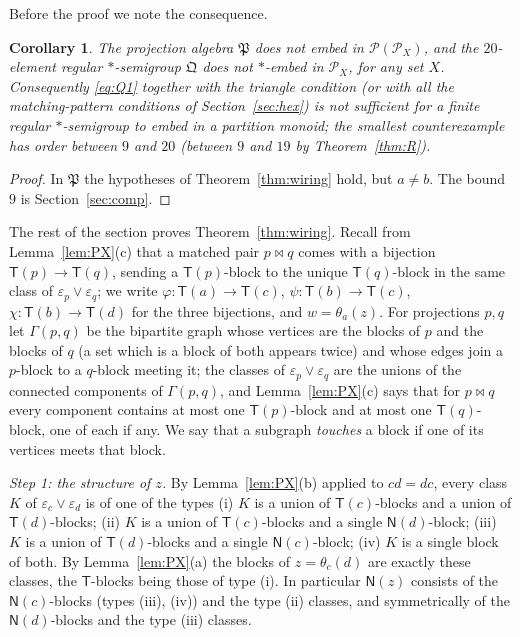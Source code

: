 \documentclass[11pt]{amsart}
\newtheorem{corollary}[theorem]{Corollary}
\theoremstyle{definition}
\renewcommand{\P}{\mathcal{P}}
\newcommand{\T}{\mathsf{T}}
\newcommand{\N}{\mathsf{N}}
\begin{document}
Before the proof we note the consequence.

\begin{corollary}\label{cor:wiring}
The projection algebra $\mathfrak P$ does not embed in $\P(\P_X)$, and the $20$-element regular $*$-semigroup $\mathfrak Q$ does not $*$-embed in $\P_X$, for any set $X$. Consequently \eqref{eq:Q1} together with the triangle condition (or with all the matching-pattern conditions of Section~\ref{sec:hex}) is not sufficient for a finite regular $*$-semigroup to embed in a partition monoid; the smallest counterexample has order between $9$ and $20$ (between $9$ and $19$ by Theorem~\ref{thm:R}).
\end{corollary}
\begin{proof}
In $\mathfrak P$ the hypotheses of Theorem~\ref{thm:wiring} hold, but $a\ne b$. The bound $9$ is Section~\ref{sec:comp}.
\end{proof}

The rest of the section proves Theorem~\ref{thm:wiring}. Recall from Lemma~\ref{lem:PX}(c) that a matched pair $p\bowtie q$ comes with a bijection $\T(p)\to\T(q)$, sending a $\T(p)$-block to the unique $\T(q)$-block in the same class of $\varepsilon_p\vee\varepsilon_q$; we write $\varphi\colon\T(a)\to\T(c)$, $\psi\colon\T(b)\to\T(c)$, $\chi\colon\T(b)\to\T(d)$ for the three bijections, and $w=\theta_a(z)$. For projections $p,q$ let $\Gamma(p,q)$ be the bipartite graph whose vertices are the blocks of $p$ and the blocks of $q$ (a set which is a block of both appears twice) and whose edges join a $p$-block to a $q$-block meeting it; the classes of $\varepsilon_p\vee\varepsilon_q$ are the unions of the connected components of $\Gamma(p,q)$, and Lemma~\ref{lem:PX}(c) says that for $p\bowtie q$ every component contains at most one $\T(p)$-block and at most one $\T(q)$-block, one of each if any. We say that a subgraph \emph{touches} a block if one of its vertices meets that block.

\smallskip
\emph{Step 1: the structure of $z$.} By Lemma~\ref{lem:PX}(b) applied to $cd=dc$, every class $K$ of $\varepsilon_c\vee\varepsilon_d$ is of one of the types (i) $K$ is a union of $\T(c)$-blocks and a union of $\T(d)$-blocks; (ii) $K$ is a union of $\T(c)$-blocks and a single $\N(d)$-block; (iii) $K$ is a union of $\T(d)$-blocks and a single $\N(c)$-block; (iv) $K$ is a single block of both. By Lemma~\ref{lem:PX}(a) the blocks of $z=\theta_c(d)$ are exactly these classes, the $\T$-blocks being those of type (i). In particular $\N(z)$ consists of the $\N(c)$-blocks (types (iii), (iv)) and the type (ii) classes, and symmetrically of the $\N(d)$-blocks and the type (iii) classes.
\end{document}
